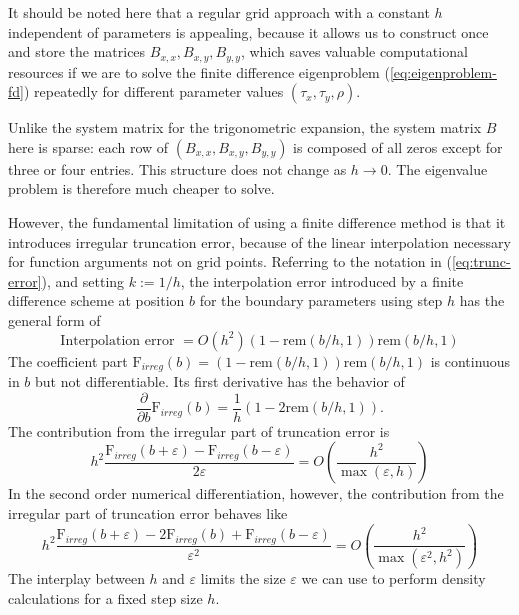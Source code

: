\documentclass[10pt]{article}
\begin{document}
It should be noted here that a regular grid approach with a constant
$h$ independent of parameters is appealing, because it allows us to
construct once and store the matrices $B_{x,x}, B_{x,y}, B_{y,y}$,
which saves valuable computational resources if we are to solve the
finite difference eigenproblem (\ref{eq:eigenproblem-fd}) repeatedly
for different parameter values $(\tau_x,\tau_y,\rho)$.

Unlike the system matrix for the trigonometric expansion, the system
matrix $B$ here is sparse: each row of $(B_{x,x}, B_{x,y}, B_{y,y})$
is composed of all zeros except for three or four entries. This
structure does not change as $h \to 0$. The eigenvalue problem is
therefore much cheaper to solve.

However, the fundamental limitation of using a finite difference
method is that it introduces irregular truncation error, because of
the linear interpolation necessary for function arguments not on grid
points. Referring to the notation in (\ref{eq:trunc-error}), and
setting $k := 1/h$, the interpolation error introduced by a finite
difference scheme at position $b$ for the boundary parameters using
step $h$ has the general form of
$$\mbox{Interpolation error } = O(h^2) (1-\mbox{rem}(b/h,1)) \mbox{rem}(b/h,1)$$ 
The coefficient part
$\mbox{F}_{irreg}(b) = (1-\mbox{rem}(b/h,1)) \mbox{rem}(b/h,1) $ is
continuous in $b$ but not differentiable. Its first derivative has the
behavior of
$$ \frac{\partial }{\partial b} \mbox{F}_{irreg}(b) =  \frac{1}{h} \left(1-2\mbox{rem}(b/h,1) \right).$$ The contribution from the irregular part of truncation error is 
$$ h^2 \frac{\mbox{F}_{irreg}(b+\varepsilon)-\mbox{F}_{irreg}(b-\varepsilon)}{2 \varepsilon}  = 
O\left(\frac{h^2}{\max(\varepsilon, h)} \right) $$ 
In the second order numerical differentiation, however, the contribution from 
the irregular part of truncation error behaves like 
$$ h^2 \frac{\mbox{F}_{irreg}(b+\varepsilon)-2\mbox{F}_{irreg}(b)
  +\mbox{F}_{irreg}(b-\varepsilon)}{\varepsilon^2 } =
O\left(\frac{h^2}{\max(\varepsilon^2, h^2)} \right) $$ The interplay
between $h$ and $\varepsilon$ limits the size $\varepsilon$ we can use
to perform density calculations for a fixed step size $h$.
\end{document}
